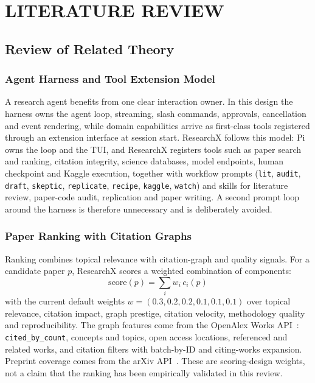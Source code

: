 \documentclass[12pt,a4paper]{report}
\numberwithin{equation}{chapter}
\begin{document}
\chapter{LITERATURE REVIEW}

\section{Review of Related Theory}

\subsection{Agent Harness and Tool Extension Model}

A research agent benefits from one clear interaction owner. In this design the
harness owns the agent loop, streaming, slash commands, approvals, cancellation
and event rendering, while domain capabilities arrive as first-class tools
registered through an extension interface at session start. ResearchX follows
this model: Pi owns the loop and the TUI, and ResearchX registers tools such as
paper search and ranking, citation integrity, science databases, model
endpoints, human checkpoint and Kaggle execution, together with workflow prompts
(\texttt{lit}, \texttt{audit}, \texttt{draft}, \texttt{skeptic},
\texttt{replicate}, \texttt{recipe}, \texttt{kaggle}, \texttt{watch}) and
skills for literature review, paper-code audit, replication and paper writing.
A second prompt loop around the harness is therefore unnecessary and is
deliberately avoided.

\subsection{Paper Ranking with Citation Graphs}

Ranking combines topical relevance with citation-graph and quality signals.
For a candidate paper $p$, ResearchX scores a weighted combination of
components:
\begin{equation}
\mathrm{score}(p) = \sum_{i} w_i \, c_i(p)
\end{equation}
with the current default weights $w = (0.3, 0.2, 0.2, 0.1, 0.1, 0.1)$ over
topical relevance, citation impact, graph prestige, citation velocity,
methodology quality and reproducibility. The graph features come from the
OpenAlex Works
API~\cite{openalex}: \texttt{cited\_by\_count}, concepts and topics, open
access locations, referenced and related works, and citation filters with
batch-by-ID and citing-works expansion. Preprint coverage comes from the
arXiv API~\cite{arxiv}. These are scoring-design weights, not a claim that
the ranking has been empirically validated in this review.
\end{document}
